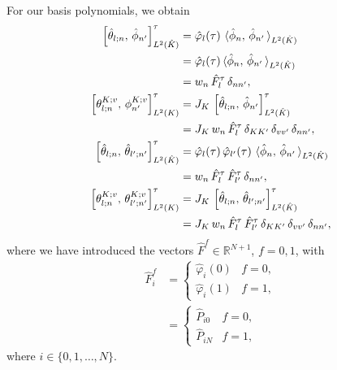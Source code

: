 \documentclass{scrreprt}
\theoremstyle{definition}
\theoremstyle{nonumberplain}
\newcommand{\cell}{K}
\newcommand{\refCell}{\hat{\cell}}
\newcommand{\detJ}{J_\cell}
\begin{document}
For our basis polynomials, we obtain
\begin{align}
\label{eq:ader_impl:operators:tau_operator_1_ref}
\left[\hat{\theta}_{l;n},\,\hat{\phi}_{n'}\right]^{\tau}_{L^2(\refCell)}
&=
\hat{\varphi}_{l}(\tau)\,
\,
\langle
\hat{\phi}_{n},\,
\hat{\phi}_{n'}\,
\rangle_{L^2(\refCell)}
\notag
\\
&=
\hat{\varphi}_{l}(\tau)\,
\langle
\hat{\phi}_{n},\,
\hat{\phi}_{n'}\,
\rangle_{L^2(\refCell)}
\notag
\\
&=
w_{n}\,
\hat{F}^\tau_l\,
\delta_{n n'},
\\
\label{eq:ader_impl:operators:tau_operator_1_mesh}
\left[\theta^{\cell;v}_{l;n},\,\phi^{\cell;v}_{n'}\right]^{\tau}_{L^2(\cell)}
&=
\detJ\,
\left[\hat{\theta}_{l;n},\,\hat{\phi}_{n'}\right]^{\tau}_{L^2(\refCell)}
\notag
\\
&=
\detJ\,
w_{n}\,
\hat{F}^\tau_l\,
\delta_{\cell\cell'}\,\delta_{vv'}\,
\delta_{n n'},
\\
\label{eq:ader_impl:operators:tau_operator_2_ref}
\left[\hat{\theta}_{l;n},\,\hat{\theta}_{l';n'}\right]^{\tau}_{L^2(\refCell)}
&=
\hat{\varphi}_{l}(\tau)\,
\hat{\varphi}_{l'}(\tau)\,
\,
\langle
\hat{\phi}_{n},\,
\hat{\phi}_{n'}\,
\rangle_{L^2(\refCell)}
\notag
\\
&=
w_{n}\,
\hat{F}^\tau_{l}\,
\hat{F}^\tau_{l'}\,
\delta_{n n'},
\\
\label{eq:ader_impl:operators:tau_operator_2_mesh}
\left[\theta^{\cell;v}_{l;n},\,\theta^{\cell;v}_{l';n'}\right]^{\tau}_{L^2(\cell)}
&=
\detJ
\,
\left[\hat{\theta}_{l;n},\,\hat{\theta}_{l';n'}\right]^{\tau}_{L^2(\refCell)}
\notag
\\
&=
\detJ\,
w_{n}\,
\hat{F}^\tau_{l}\,
\hat{F}^\tau_{l'}\,
\delta_{\cell\cell'}\,\delta_{vv'}\,
\delta_{n n'},
\end{align}
where we have introduced the vectors $\hat{F}^f \in \mathbb{R}^{N+1}$,
$f=0,1$, with
\begin{align}
\label{eq:ader_impl:operators:boundary_values}
\hat{F}^f_i
&=
\begin{cases}
\hat{\varphi}_i(0) & f = 0, \\
\hat{\varphi}_i(1) & f = 1,
\end{cases} \\
&=
\begin{cases}
\hat{P}_{i0} & f = 0, \\
\hat{P}_{iN} & f = 1,
\end{cases}
\end{align}
where $i\in\{0,1,\ldots,N\}$.
\end{document}
